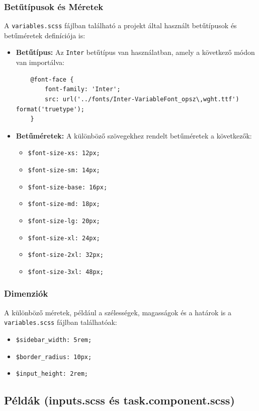 \documentclass[12pt]{report}
\begin{document}
\subsubsection{Betűtípusok és Méretek}
A \texttt{variables.scss} fájlban található a projekt által használt betűtípusok és betűméretek definíciója is:

\begin{itemize}
    \item \textbf{Betűtípus:} Az \texttt{Inter} betűtípus van használatban, amely a következő módon van importálva:
    \begin{verbatim}
    @font-face {
        font-family: 'Inter';
        src: url('../fonts/Inter-VariableFont_opsz\,wght.ttf') format('truetype');
    }
    \end{verbatim}
    \item \textbf{Betűméretek:} A különböző szövegekhez rendelt betűméretek a következők:
    \begin{itemize}
        \item \texttt{\$font-size-xs: 12px;}
        \item \texttt{\$font-size-sm: 14px;}
        \item \texttt{\$font-size-base: 16px;}
        \item \texttt{\$font-size-md: 18px;}
        \item \texttt{\$font-size-lg: 20px;}
        \item \texttt{\$font-size-xl: 24px;}
        \item \texttt{\$font-size-2xl: 32px;}
        \item \texttt{\$font-size-3xl: 48px;}
    \end{itemize}
\end{itemize}

\subsubsection{Dimenziók}
A különböző méretek, például a szélességek, magasságok és a határok is a \texttt{variables.scss} fájlban találhatóak:

\begin{itemize}
    \item \texttt{\$sidebar\_width: 5rem;}
    \item \texttt{\$border\_radius: 10px;}
    \item \texttt{\$input\_height: 2rem;}
\end{itemize}

\subsection{Példák (inputs.scss és task.component.scss)}
\end{document}

